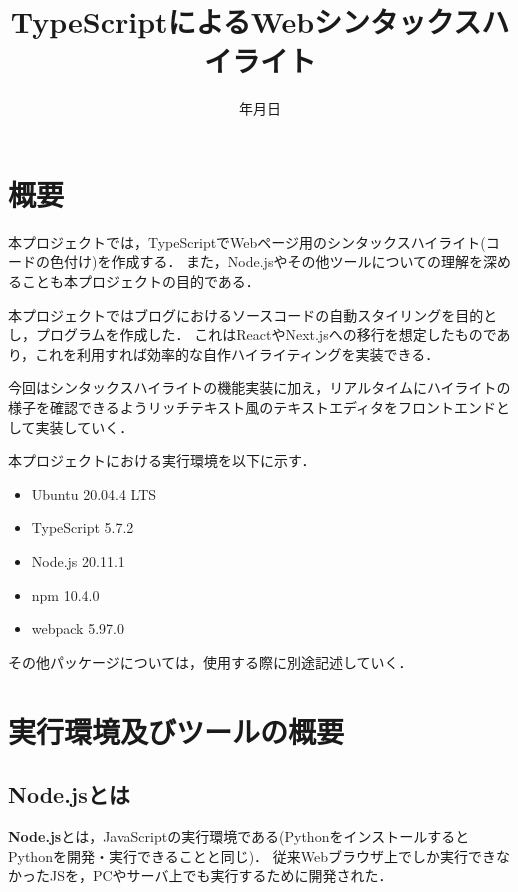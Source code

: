 \documentclass[autodetect-engine,dvi=dvipdfmx,ja=standard,
               a4j,11pt]{bxjsarticle}
\title{TypeScriptによるWebシンタックスハイライト}
\date{\number\year 年\number\month 月\number\day 日}
\begin{document}
\maketitle

\section{概要}

本プロジェクトでは，TypeScriptでWebページ用のシンタックスハイライト(コードの色付け)を作成する．
また，Node.jsやその他ツールについての理解を深めることも本プロジェクトの目的である．

本プロジェクトではブログにおけるソースコードの自動スタイリングを目的とし，プログラムを作成した．
これはReactやNext.jsへの移行を想定したものであり，これを利用すれば効率的な自作ハイライティングを実装できる．

今回はシンタックスハイライトの機能実装に加え，リアルタイムにハイライトの様子を確認できるようリッチテキスト風のテキストエディタをフロントエンドとして実装していく．

本プロジェクトにおける実行環境を以下に示す．

\begin{itemize}
  \item Ubuntu 20.04.4 LTS
  \item TypeScript 5.7.2
  \item Node.js 20.11.1
  \item npm 10.4.0
  \item webpack 5.97.0
\end{itemize}
%
その他パッケージについては，使用する際に別途記述していく．

\section{実行環境及びツールの概要}

\subsection{Node.jsとは}

{\bf Node.js}とは，JavaScriptの実行環境である(PythonをインストールするとPythonを開発・実行できることと同じ)．
従来Webブラウザ上でしか実行できなかったJSを，PCやサーバ上でも実行するために開発された．
\end{document}
